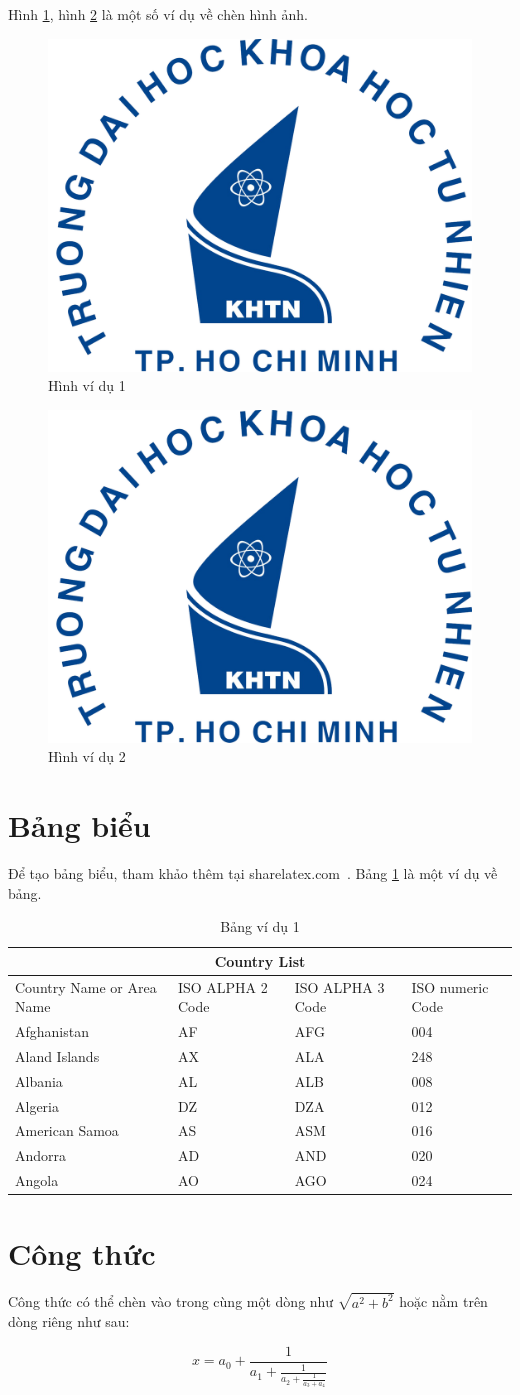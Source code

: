 Hình \ref{fig:vd1}, hình \ref{fig:vd2} là một số ví dụ về chèn hình ảnh.

\begin{figure}[htp]
\centering
\includegraphics[width=6 cm]{images/logo-khtn}
\caption{Hình ví dụ 1}
\label{fig:vd1}
\end{figure}

\begin{figure}[htp]
\centering
\includegraphics[width=40 mm]{images/logo-khtn}
\caption{Hình ví dụ 2}
\label{fig:vd2}
\end{figure}

\section{Bảng biểu}

Để tạo bảng biểu, tham khảo thêm tại sharelatex.com~\cite{Tables}. Bảng \ref{tab:vd1} là một ví dụ về bảng.

\begin{table}[ht]
\caption{Bảng ví dụ 1}
\label{tab:vd1}%
\begin{center}
\begin{tabular}{ |p{3cm}||p{3cm}|p{3cm}|p{3cm}|  }
 \hline
 \multicolumn{4}{|c|}{Country List} \\
 \hline
 Country Name     or Area Name& ISO ALPHA 2 Code &ISO ALPHA 3 Code&ISO numeric Code\\
 \hline
 Afghanistan   & AF    &AFG&   004\\
 Aland Islands&   AX  & ALA   &248\\
 Albania &AL & ALB&  008\\
 Algeria    &DZ & DZA&  012\\
 American Samoa&   AS  & ASM&016\\
 Andorra& AD  & AND   &020\\
 Angola& AO  & AGO&024\\
 \hline
\end{tabular}
\end{center}
\end{table}

\section{Công thức}

Công thức có thể chèn vào trong cùng một dòng như $ \sqrt{a^2+b^2} $ hoặc nằm trên dòng riêng như sau:

\begin{equation}
x = a_0 + \frac{1}{a_1 + \frac{1}{a_2 + \frac{1}{a_3 + a_4}}}
\end{equation}